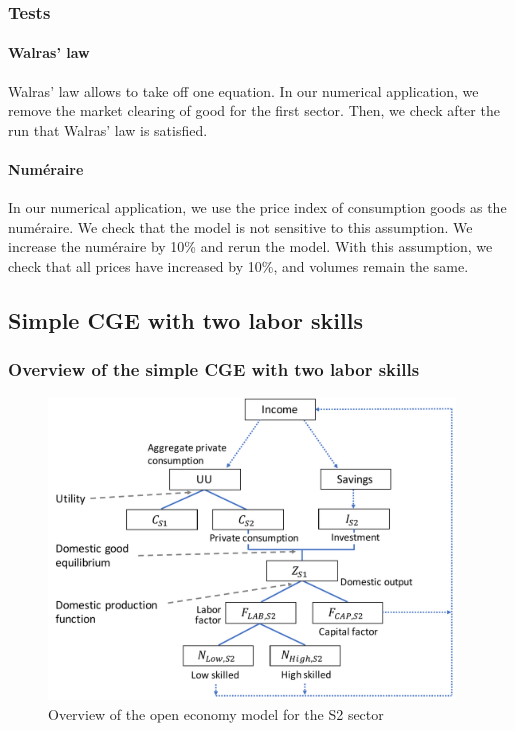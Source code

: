 \subsubsection{Tests}

\paragraph{Walras' law}
Walras' law allows to take off one equation. 
In our numerical application, we remove the market clearing of good for the first sector.
Then, we check after the run that Walras' law is satisfied.

\paragraph{Numéraire}
In our numerical application, we use the price index of consumption goods as the numéraire. 
We check that the model is not sensitive to this assumption. We increase the numéraire by 10\% and rerun the model.
With this assumption, we check that all prices have increased by 10\%, and volumes remain the same.


\clearpage

\subsection{Simple CGE with two labor skills}
\label{app:two_labour_model}

\subsubsection{Overview of the simple CGE with two labor skills}
\begin{figure}[!h]
	\centering
	\includegraphics[height=8cm]{figures/overview_twoLabors.pdf}
	\caption{Overview of the open economy model for the S2 sector}
	\label{fig:overview_twoLabors}
\end{figure}

